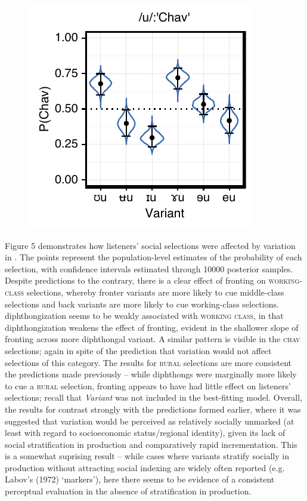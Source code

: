 \documentclass[PWPL]{article}
\begin{document}
\begin{figure}[ht]
\includegraphics[scale=0.65]{uw_chav.pdf}
\end{figure}
Figure 5 demonstrates how listeners' social selections were affected by variation in . The points represent the population-level estimates of the probability of each selection, with confidence intervals estimated through 10000 posterior samples. Despite predictions to the contrary, there is a clear effect of fronting on \textsc{working-class} selections, whereby fronter  variants are more likely to cue middle-class selections and back variants are more likely to cue working-class selections.  diphthongization seems to be weakly associated with \textsc{working class}, in that diphthongization weakens the effect of fronting, evident in the shallower slope of fronting across more diphthongal  variant. A similar pattern is visible in the \textsc{chav} selections; again in spite of the prediction that  variation would not affect selections of this category. The results for \textsc{rural} selections are more consistent the predictions made previously -- while  diphthongs were marginally more likely to cue a \textsc{rural} selection, fronting appears to have had little effect on listeners' selections; recall that \textit{Variant} was not included in the best-fitting model. Overall, the results for  contrast strongly with the predictions formed earlier, where it was suggested that  variation would be perceived as relatively socially unmarked (at least with regard to socioeconomic status/regional identity), given its lack of social stratification in production and comparatively rapid incrementation. This is a somewhat suprising result -- while cases where variants stratify socially in production without attracting social indexing are widely often reported (e.g. Labov's (1972) `markers'), here there seems to be evidence of a consistent perceptual evaluation in the absence of stratification in production. 
\end{document}
